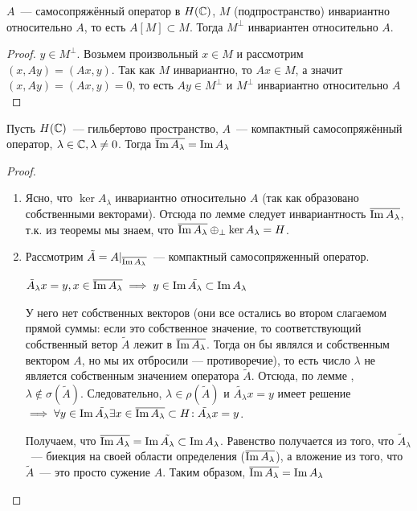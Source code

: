 \begin{lemma}[3]\label{fredholm:lemma3}
    $A$~--- самосопряжённый оператор в $H(\mathbb{C})$, $M$ (подпространство) инвариантно относительно $A$, то есть $A[M] \subset M$. Тогда $M^\perp$ инвариантен относительно $A$.
\end{lemma}

\begin{proof}
    $y \in M^\perp$. Возьмем произвольный $x \in M$ и рассмотрим $(x, Ay) = (Ax, y)$. Так как $M$ инвариантно, то $Ax \in M$, а значит $(x, Ay)=(Ax, y)=0$, то есть $Ay \in M^\perp$ и $M^\perp$ инвариантно относительно $A$
\end{proof}

\begin{lemma}[2]\label{fredholm:lemma2}
    Пусть $H(\mathbb{C})$~--- гильбертово пространство, $A$~--- компактный самосопряжённый оператор, $\lambda \in \mathbb{C}, \lambda \neq 0$. Тогда $\overline{\operatorname{Im} A_\lambda} = \operatorname{Im} A_\lambda$
\end{lemma}

\begin{proof}
    \begin{enumerate}
        \item Ясно, что $\ker A_{\lambda}$ инвариантно относительно $A$ (так как образовано собственными векторами). %
        Отсюда по лемме  следует инвариантность $\overline{\operatorname{Im} A_\lambda}$, т.к. из теоремы  мы знаем, что $\overline{\operatorname{Im} A_{\lambda}} \oplus_{\perp} \ker A_{\lambda} = H$.
        \item Рассмотрим $\tilde{A}=A|_{\overline{\operatorname{Im} A_\lambda}}$~--- компактный самосопряженный оператор. 
        
        $\tilde{A}_\lambda x = y, x \in \overline{\operatorname{Im} A_\lambda} \implies y \in \operatorname{Im} \tilde{A_\lambda} \subset \operatorname{Im} A_\lambda$
        
        У него нет собственных векторов (они все остались во втором слагаемом прямой суммы: если это собственное значение, то соответствующий собственный ветор $\tilde{A}$ лежит в $\overline{\operatorname{Im} A_\lambda}$. Тогда он бы являлся и собственным вектором $A$, но мы их отбросили --- противоречие), то есть число $\lambda$ не является собственным значением оператора $\tilde{A}$. Отсюда, по лемме , $\lambda \not\in \sigma(\tilde{A})$. Следовательно, $\lambda \in \rho(\tilde{A})$ и $\tilde{A_\lambda}x=y$ имеет решение $\implies \forall y \in  \operatorname{Im} \tilde{A_\lambda} \exists x \in \overline{\operatorname{Im} A_\lambda} \subset H\!: \tilde{A_\lambda}x=y$.
        
        Получаем, что $\overline{\operatorname{Im} A_{\lambda}} = \operatorname{Im} \tilde{A_{\lambda}} \subset \operatorname{Im} A_{\lambda}$. Равенство получается из того, что $\tilde{A}_\lambda$~--- биекция на своей области определения ($\overline{\operatorname{Im} A_{\lambda}}$), а вложение из того, что $\tilde{A}$~--- это просто сужение $A$. Таким образом, $\overline{\operatorname{Im} A_{\lambda}} = \operatorname{Im} A_{\lambda}$
    \end{enumerate}
\end{proof}

